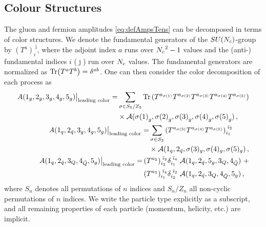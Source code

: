 \subsection{Colour Structures}
The gluon and fermion amplitudes \eqref{eq:defAmpsTens}
can be decomposed 
in terms of color structures. 
We denote the fundamental generators of the
$SU({N_c})$-group by $(T^a)^{\;\bar{\jmath}}_{i}$, where the
adjoint index $a$ runs over ${N_c}^2-1$ values and the 
(anti-) fundamental indices $i$  ($\bar \jmath$)
run over ${N_c}$ values. The fundamental generators are normalized
as $ \Tr(T^a T^b) = \delta^{ab}$. One can then consider the color decomposition of
each process as
%
\begin{align}
  \begin{split}
    \label{eq:ColorDecG}
    A(1_g, 2_g, 3_g, 4_g, 5_g) \big\vert_{\textrm{leading color}} = &
    \sum_{\sigma\in S_5/Z_5} \Tr\left(
    T^{a_{\sigma(1)}} T^{a_{\sigma(2)}} 
    T^{a_{\sigma(3)}} T^{a_{\sigma(4)}} T^{a_{\sigma(5)}} \right)\\
    &\times \mathcal{A}({\sigma(1)}_g, {\sigma(2)}_g, {\sigma(3)}_g, {\sigma(4)}_g, {\sigma(5)}_g)\,, 
  \end{split} \\
  \begin{split}
    \label{eq:ColorDec2Q}
    A(1_q, 2_{\bar{q}}, 3_g, 4_g, 5_g) \big\vert_{\textrm{leading color}} 
    = & \sum_{\sigma\in S_3} 
    \left( T^{a_{\sigma(3)}} T^{a_{\sigma(4)}} T^{a_{\sigma(5)}} \right)^{\;\bar{\imath}_2}_{i_1} \\
    & \times\mathcal{A}(1_q,2_{\bar{q}},\sigma(3)_g,\sigma(4)_g,\sigma(5)_g)\,,
  \end{split}\\
  \begin{split}
    \label{eq:ColorDec4Q}
    A(1_q, 2_{\bar{q}}, 3_Q, 4_{\bar{Q}}, 5_g)
    \big\vert_{\textrm{leading color}} 
    = & 
    \,(T^{a_5})^{\;\bar{\imath}_{2}}_{i_{3}} \delta^{\;\bar{\imath}_{4}}_{i_{1}}\;
    \mathcal{A}(1_{q}, 2_{\bar{q}}, 5_g, 3_{Q}, 4_{\bar{Q}}) \,\,+  \\
    & \,(T^{a_5})^{\;\bar{\imath}_{4}}_{i_{1}} \delta^{\;\bar{\imath}_{2}}_{i_{3}}\;
    \mathcal{A}(1_{q},2_{\bar{q}},3_{Q},4_{\bar{Q}},5_g) \,,
  \end{split}
\end{align}
where $S_n$ denotes all permutations of $n$ indices and 
$S_n/Z_n$ all non-cyclic permutations of $n$ indices. 
We write the particle type explicitly as a subscript, and all
remaining properties of each particle (momentum, helicity, 
etc.) are implicit. 

